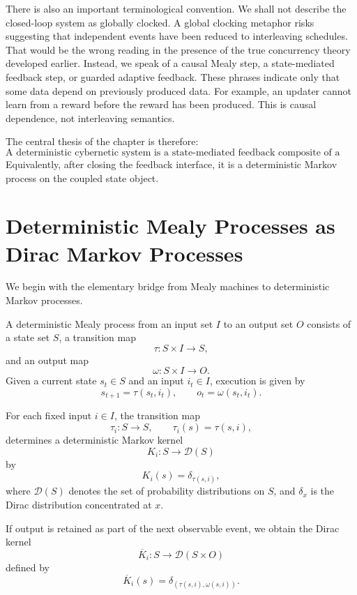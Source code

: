 There is also an important terminological convention.  We shall not describe the closed-loop system
as globally clocked.  A global clocking metaphor risks suggesting that independent events have been
reduced to interleaving schedules.  That would be the wrong reading in the presence of the true
concurrency theory developed earlier.  Instead, we speak of a causal Mealy step, a state-mediated
feedback step, or guarded adaptive feedback.  These phrases indicate only that some data depend on
previously produced data.  For example, an updater cannot learn from a reward before the reward has
been produced.  This is causal dependence, not interleaving semantics.

The central thesis of the chapter is therefore:
\[
\boxed{
\text{A deterministic cybernetic system is a state-mediated feedback composite of a plant and
an adaptive controller.}
}
\]
Equivalently, after closing the feedback interface, it is a deterministic Markov process on the
coupled state object.

\section{Deterministic Mealy Processes as Dirac Markov Processes}
\label{sec:mealy-dirac-markov}

We begin with the elementary bridge from Mealy machines to deterministic Markov processes.

\begin{definition}
\label{def:deterministic-mealy-process}
A deterministic Mealy process from an input set \(I\) to an output set \(O\) consists of a state
set \(S\), a transition map
\[
\tau:S\times I\longrightarrow S,
\]
and an output map
\[
\omega:S\times I\longrightarrow O.
\]
Given a current state \(s_t\in S\) and an input \(i_t\in I\), execution is given by
\[
s_{t+1}=\tau(s_t,i_t),
\qquad
o_t=\omega(s_t,i_t).
\]
\end{definition}

For each fixed input \(i\in I\), the transition map
\[
\tau_i:S\longrightarrow S,
\qquad
\tau_i(s)=\tau(s,i),
\]
determines a deterministic Markov kernel
\[
K_i:S\longrightarrow \mathcal D(S)
\]
by
\[
K_i(s)=\delta_{\tau(s,i)},
\]
where \(\mathcal D(S)\) denotes the set of probability distributions on \(S\), and
\(\delta_x\) is the Dirac distribution concentrated at \(x\).

If output is retained as part of the next observable event, we obtain the Dirac kernel
\[
\overline K_i:S\longrightarrow \mathcal D(S\times O)
\]
defined by
\[
\overline K_i(s)=\delta_{(\tau(s,i),\omega(s,i))}.
\]

